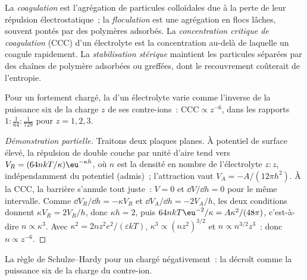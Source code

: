 \begin{definition}\label{def:b3:colloids:stability}
La \emph{coagulation} est l'agrégation de particules
colloïdales due à la perte de leur répulsion électrostatique~; la
\emph{floculation}
est une agrégation en flocs lâches, souvent pontés par des polymères
adsorbés. La
\emph{concentration critique de coagulation}
(CCC) d'un électrolyte est la concentration au-delà de laquelle un
 coagule rapidement. La \emph{stabilisation stérique}
maintient les particules séparées par des chaînes de polymère adsorbées
ou greffées, dont le recouvrement coûterait de l'entropie.
\end{definition}

\begin{proposition}\label{prop:b3:colloids:schulze-hardy}
Pour un  fortement chargé, la  d'un électrolyte varie comme l'inverse de la puissance six
de la charge $z$ de ses contre-ions~: $\text{CCC} \propto z^{-6}$, dans
les rapports $1 : \frac{1}{64} : \frac{1}{729}$ pour $z = 1, 2, 3$.
\end{proposition}

\begin{proof}[Démonstration partielle]
Traitons deux plaques planes. À potentiel de surface élevé, la répulsion
de double couche par unité d'aire tend vers $V_R = (64nkT/\kappa)\eu^{-\kappa h}$,
où $n$ est la densité en nombre de l'électrolyte $z{:}z$,
indépendamment du potentiel (admis)~; l'attraction vaut $V_A =
-A/(12\pi h^2)$. À la CCC, la barrière s'annule tout juste~: $V = 0$ et
$\dd V/\dd h = 0$ pour le même
intervalle. Comme $\dd V_R/\dd h = -\kappa V_R$ et $\dd V_A/\dd h = -2V_A/h$,
les deux conditions donnent
$\kappa V_R = 2V_R/h$, donc $\kappa h = 2$, puis $64nkT\eu^{-2}/\kappa = A\kappa^2/(48\pi)$, c'est-à-dire $n \propto \kappa^3$. Avec
$\kappa^2 = 2nz^2e^2/(\varepsilon kT)$, $\kappa^3 \propto (nz^2)^{3/2}$ et $n \propto n^{3/2}z^3$~: donc $n \propto z^{-6}$.
\end{proof}

\begin{omfigure}

{\small La règle de Schulze--Hardy pour un  chargé négativement~:
la  décroît comme la puissance six
de la charge du contre-ion.}
\end{omfigure}


